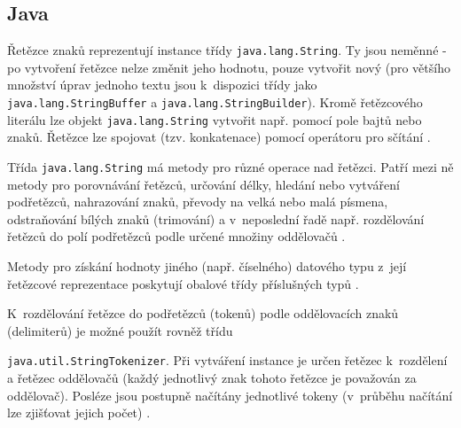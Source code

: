 \documentclass[onepage, a4paper, 12pt]{bakalarka}
\begin{document}
\subsection{Java}
Řetězce znaků reprezentují instance třídy \texttt{java.lang.String}. Ty jsou neměnné - po vytvoření řetězce nelze změnit jeho hodnotu, pouze vytvořit nový (pro většího množství úprav jednoho textu jsou k~dispozici třídy jako \texttt{java.lang.StringBuffer} a \texttt{java.lang.StringBuilder}). Kromě řetězcového literálu lze objekt \texttt{java.lang.String} vytvořit např. pomocí pole bajtů nebo znaků. Řetězce lze spojovat (tzv. konkatenace) pomocí operátoru pro sčítání \cite{java-guide-strings, java-guide-string, java-guide-stringbuffer, java-guide-stringbuilder}.\par
Třída \texttt{java.lang.String} má metody pro různé operace nad řetězci. Patří mezi ně metody pro porovnávání řetězců, určování délky, hledání nebo vytváření podřetězců, nahrazování znaků, převody na velká nebo malá písmena, odstraňování bílých znaků (trimování) a v~neposlední řadě např. rozdělování řetězců do polí podřetězců podle určené množiny oddělovačů \cite{java-guide-string}.\par
Metody pro získání hodnoty jiného (např. číselného) datového typu z~její řetězcové reprezentace poskytují obalové třídy příslušných typů \cite{java-guide-string, java-guide-byte, java-guide-short, java-guide-integer, java-guide-long, java-guide-float, java-guide-double, java-guide-boolean, java-guide-character}.\par
K~rozdělování řetězce do podřetězců (tokenů) podle oddělovacích znaků (delimiterů) je možné použít rovněž třídu \par\noindent\texttt{java.util.StringTokenizer}. Při vytváření instance je určen řetězec k~rozdělení a řetězec oddělovačů (každý jednotlivý znak tohoto řetězce je považován za oddělovač). Posléze jsou postupně načítány jednotlivé tokeny (v~průběhu načítání lze zjišťovat jejich počet) \cite{java-guide-stringtokenizer}.
\end{document}
